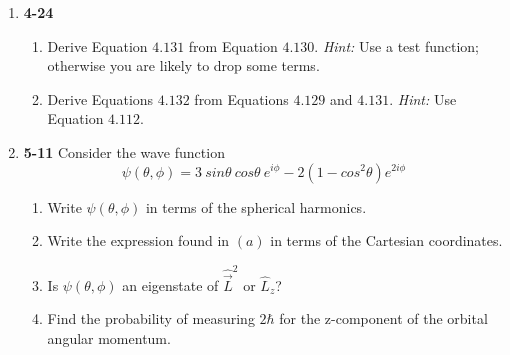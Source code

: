 \documentclass[fleqn]{article}
\begin{document}
  \begin{enumerate}
    \item \textbf{4-24} 
    \begin{enumerate}
      \item Derive Equation $4.131$ from Equation $4.130$. \emph{Hint:} Use a test function; otherwise
      you are likely to drop some terms.


      \item Derive Equations $4.132$ from Equations $4.129$ and $4.131$. \emph{Hint:} Use Equation $4.112$.


    \end{enumerate}


    \item \textbf{5-11} Consider the wave function
    $$
      \psi(\theta, \phi)=3 ~ sin\theta ~ cos\theta ~ e^{i \phi}-2\left(1-cos^2\theta\right) e^{2i\phi}
    $$
    \begin{enumerate}
      \item Write $\psi(\theta, \phi)$ in terms of the spherical harmonics.



      \item Write the expression found in $(a)$ in terms of the Cartesian coordinates.


      \item Is $\psi(\theta, \phi)$ an eigenstate of $\hat{\overrightarrow{L}}^2$ or $\hat{L}_z$?


      \item Find the probability of measuring $2 \hbar$ for the z-component of the orbital angular momentum.


    \end{enumerate}

  \end{enumerate}
\end{document}
